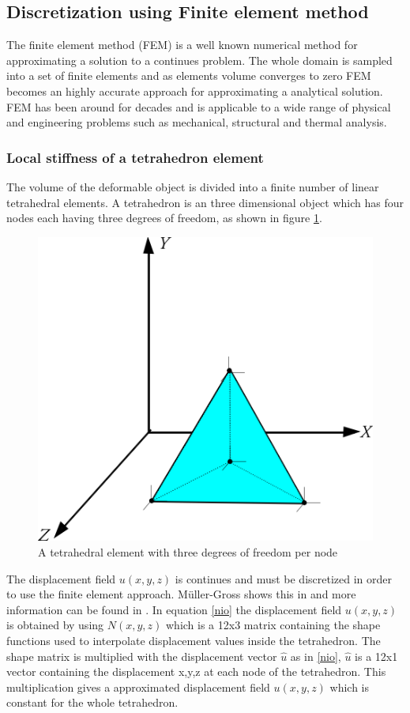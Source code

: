 \documentclass[10pt,a4paper]{article}
\begin{document}
\subsection{Discretization using Finite element method}
The finite element method (FEM) is a well known numerical method for approximating a solution to a continues problem. The whole domain is sampled into a set of finite elements and as elements volume converges to zero FEM becomes an highly accurate approach for approximating a analytical solution. FEM has been around for decades and is applicable to a wide range of physical and engineering problems such as mechanical, structural and thermal analysis.

\subsubsection{Local stiffness of a tetrahedron element}\label{sec:localstiffness}
The volume of the deformable object is divided into a finite number of linear tetrahedral elements. A tetrahedron is an three dimensional object which has four nodes each having three degrees of freedom, as shown in figure \ref{fig:tetracoord}.

\begin{figure}[htpb]
\centering
\includegraphics[width=.3\columnwidth]{figures/tetra_coord.png}
\caption{A tetrahedral element with three degrees of freedom per node}
\label{fig:tetracoord}
\end{figure}

The displacement field $u(x,y,z)$ is continues and must be discretized in order to use the finite element approach. M\"uller-Gross shows this in \cite{muller_ivm} and more information can be found in \cite{fem_liu}. In equation \ref{nio} the displacement field $u(x,y,z)$ is obtained by using $N(x,y,z)$ which is a 12x3 matrix containing the shape functions used to interpolate displacement values inside the tetrahedron. The shape matrix is multiplied with the displacement vector $\hat{u}$ as in \ref{nio}, $\hat{u}$ is a 12x1 vector containing the displacement x,y,z at each node of the tetrahedron. This multiplication gives a approximated displacement field $u(x,y,z)$ which is constant for the whole tetrahedron.
\end{document}
